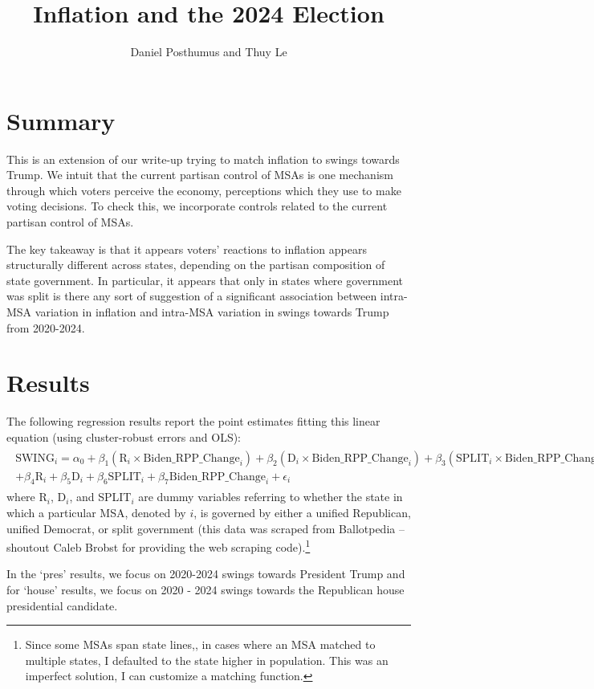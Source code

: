 \documentclass{article}
\title{Inflation and the 2024 Election}
\author{Daniel Posthumus and Thuy Le}
\begin{document}
\maketitle 

\section{Summary}

This is an extension of our write-up trying to match inflation to swings towards Trump. We intuit that the current partisan control of MSAs is one mechanism through which voters perceive the economy, perceptions which they use to make voting decisions. To check this, we incorporate controls related to the current partisan control of MSAs. 

The key takeaway is that it appears voters' reactions to inflation appears structurally different across states, depending on the partisan composition of state government. In particular, it appears that only in states where government was split is there any sort of suggestion of a significant association between intra-MSA variation in inflation and intra-MSA variation in swings towards Trump from 2020-2024.

\section{Results}

The following regression results report the point estimates fitting this linear equation (using cluster-robust errors and OLS):
\begin{gather}
\begin{split}
	\text{SWING}_i = \alpha_0 + \beta_1 (\text{R}_i \times \text{Biden\_RPP\_Change}_i) + \beta_2 (\text{D}_i \times \text{Biden\_RPP\_Change}_i) + \beta_3 (\text{SPLIT}_i \times \text{Biden\_RPP\_Change}_i)  \\
	+ \beta_4 \text{R}_i + \beta_5 \text{D}_i + \beta_6 \text{SPLIT}_i + \beta_7 \text{Biden\_RPP\_Change}_i + \epsilon_i
\end{split}
\end{gather}
where R$_i$, D$_i$, and SPLIT$_i$ are dummy variables referring to whether the state in which a particular MSA, denoted by $i$, is governed by either a unified Republican, unified Democrat, or split government (this data was scraped from Ballotpedia -- shoutout Caleb Brobst for providing the web scraping code).\footnote{Since some MSAs span state lines,, in cases where an MSA matched to multiple states, I defaulted to the state higher in population. This was an imperfect solution, I can customize a matching function.}

In the `pres' results, we focus on 2020-2024 swings towards President Trump and for `house' results, we focus on 2020 - 2024 swings towards the Republican house presidential candidate. 




\end{document}
